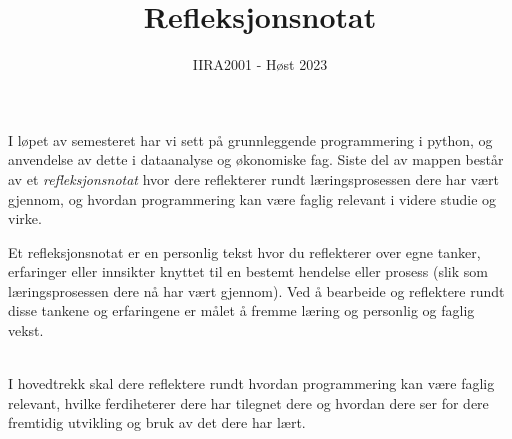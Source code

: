 \documentclass[12pt, titlepage]{article}
\begin{document}
\title{Refleksjonsnotat}
\author{IIRA2001 - Høst 2023}
\date{}
\maketitle

I løpet av semesteret har vi sett på grunnleggende programmering i python, og anvendelse av dette i dataanalyse og økonomiske fag.
Siste del av mappen består av et \textit{refleksjonsnotat} hvor dere reflekterer rundt læringsprosessen dere har vært gjennom, og hvordan programmering kan være faglig relevant i videre studie og virke.

Et refleksjonsnotat er en personlig tekst hvor du reflekterer over egne tanker, erfaringer eller innsikter knyttet til en bestemt hendelse eller prosess (slik som læringsprosessen dere nå har vært gjennom).
Ved å bearbeide og reflektere rundt disse tankene og erfaringene er målet å fremme læring og personlig og faglig vekst.

~\\
I hovedtrekk skal dere reflektere rundt hvordan programmering kan være faglig relevant, hvilke ferdiheterer dere har tilegnet dere og hvordan dere ser for dere fremtidig utvikling og bruk av det dere har lært.\\
\end{document}
